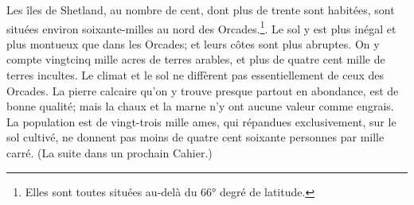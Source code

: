 Les îles de Shetland, au nombre de cent, dont plus de trente sont habitées, sont situées environ soixante-milles au nord des Orcades.\footnote{Elles sont toutes situées au-delà du 66° degré de latitude.}. Le sol y est plus inégal et plus montueux que dans les Orcades; et leurs côtes sont plus abruptes. On y compte vingtcinq mille acres de terres arables, et plus de quatre cent mille de terres incultes. Le climat et le sol ne diffèrent pas essentiellement de ceux des Orcades. La pierre calcaire qu'on y trouve presque partout en abondance, est de bonne qualité; mais la chaux et la marne\setcounter{page}{391} n'y ont aucune valeur comme engrais. La population est de vingt-trois mille ames, qui répandues exclusivement, sur le sol cultivé, ne donnent pas moins de quatre cent soixante personnes par mille carré.
(La suite dans un prochain Cahier.)

